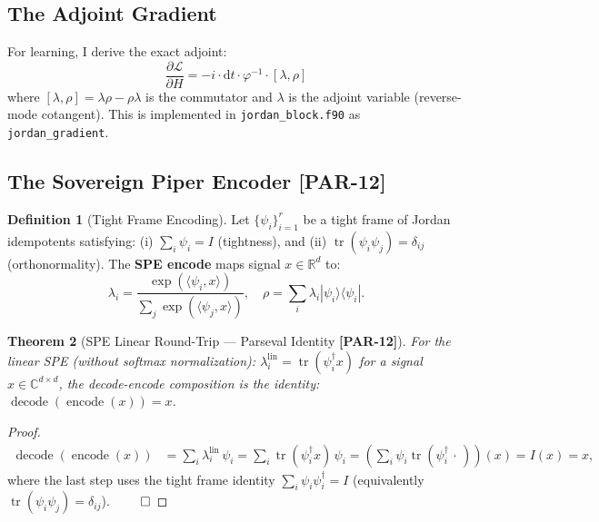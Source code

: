 \documentclass[12pt, letterpaper]{article}
\theoremstyle{plain}
\newtheorem{theorem}{Theorem}[section]
\theoremstyle{definition}
\newtheorem{definition}[theorem]{Definition}
\theoremstyle{remark}
\newcommand{\phiinv}{\varphi^{-1}}
\newcommand{\prior}[1]{\textcolor{SovGold}{\textbf{[PAR-#1]}}}
\begin{document}
\subsection{The Adjoint Gradient}

For learning, I derive the exact adjoint:
\begin{equation}
  \frac{\partial \mathcal{L}}{\partial H}
  = -i \cdot \mathrm{d}t \cdot \phiinv \cdot [\lambda, \rho]
  \label{eq:jordan_gradient}
\end{equation}
where $[\lambda, \rho] = \lambda\rho - \rho\lambda$ is the commutator and
$\lambda$ is the adjoint variable (reverse-mode cotangent).
This is implemented in \texttt{jordan\_block.f90} as \texttt{jordan\_gradient}.

\subsection{The Sovereign Piper Encoder \prior{12}}

\begin{definition}[Tight Frame Encoding]
Let $\{\psi_i\}_{i=1}^r$ be a tight frame of Jordan idempotents satisfying:
(i) $\sum_i \psi_i = I$ (tightness), and (ii) $\operatorname{tr}(\psi_i\psi_j) = \delta_{ij}$
(orthonormality). The \textbf{SPE encode} maps signal $x \in \mathbb{R}^d$ to:
\[
  \lambda_i = \frac{\exp(\langle\psi_i, x\rangle)}{\sum_j \exp(\langle\psi_j, x\rangle)},
  \quad \rho = \sum_i \lambda_i |\psi_i\rangle\langle\psi_i|.
\]
\end{definition}

\begin{theorem}[SPE Linear Round-Trip --- Parseval Identity \prior{12}]
\label{thm:spe_roundtrip}
For the \emph{linear} SPE (without softmax normalization):
$\lambda_i^{\mathrm{lin}} = \operatorname{tr}(\psi_i^\dagger x)$ for a signal $x \in \mathbb{C}^{d \times d}$,
the decode-encode composition is the identity: $\operatorname{decode}(\operatorname{encode}(x)) = x$.
\end{theorem}

\begin{proof}
\begin{align*}
  \operatorname{decode}(\operatorname{encode}(x))
  &= \sum_i \lambda_i^{\mathrm{lin}}\,\psi_i
   = \sum_i \operatorname{tr}(\psi_i^\dagger x)\,\psi_i
   = \left(\sum_i \psi_i \operatorname{tr}(\psi_i^\dagger \,\cdot\,)\right)(x)
   = I(x) = x,
\end{align*}
where the last step uses the tight frame identity $\sum_i \psi_i \psi_i^\dagger = I$
(equivalently $\operatorname{tr}(\psi_i \psi_j) = \delta_{ij}$). $\qed$
\end{proof}
\end{document}
